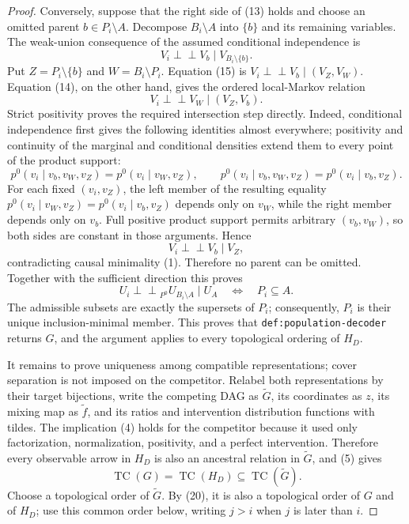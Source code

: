 \documentclass{article}
\begin{document}
\begin{proof}
Conversely, suppose that the right side of (13) holds and choose an omitted parent \(b\in P_i\setminus A\).  Decompose \(B_i\setminus A\) into \(\{b\}\) and its remaining variables.  The weak-union consequence of the assumed conditional independence is
\[
 V_i\mathbin{\perp\!\!\!\perp}V_b
 \mid V_{B_i\setminus\{b\}}.
\tag{15}
\]
Put \(Z=P_i\setminus\{b\}\) and \(W=B_i\setminus P_i\).  Equation (15) is \(V_i\mathbin{\perp\!\!\!\perp}V_b\mid(V_Z,V_W)\).  Equation (14), on the other hand, gives the ordered local-Markov relation
\[
 V_i\mathbin{\perp\!\!\!\perp}V_W\mid(V_Z,V_b).
\tag{16}
\]
Strict positivity proves the required intersection step directly.  Indeed, conditional independence first gives the following identities almost everywhere; positivity and continuity of the marginal and conditional densities extend them to every point of the product support:
\[
 p^0(v_i\mid v_b,v_W,v_Z)=p^0(v_i\mid v_W,v_Z),
 \qquad
 p^0(v_i\mid v_b,v_W,v_Z)=p^0(v_i\mid v_b,v_Z).
\tag{17}
\]
For each fixed \((v_i,v_Z)\), the left member of the resulting equality \(p^0(v_i\mid v_W,v_Z)=p^0(v_i\mid v_b,v_Z)\) depends only on \(v_W\), while the right member depends only on \(v_b\).  Full positive product support permits arbitrary \((v_b,v_W)\), so both sides are constant in those arguments.  Hence
\[
 V_i\mathbin{\perp\!\!\!\perp}V_b\mid V_Z,
\tag{18}
\]
contradicting causal minimality (1).  Therefore no parent can be omitted.  Together with the sufficient direction this proves
\[
 U_i\mathbin{\perp\!\!\!\perp}_{P^0}U_{B_i\setminus A}\mid U_A
 \quad\Longleftrightarrow\quad P_i\subseteq A.
\tag{19}
\]
The admissible subsets are exactly the supersets of \(P_i\); consequently, \(P_i\) is their unique inclusion-minimal member.  This proves that \texttt{def:population-decoder} returns \(G\), and the argument applies to every topological ordering of \(H_D\).

It remains to prove uniqueness among compatible representations; cover separation is not imposed on the competitor.  Relabel both representations by their target bijections, write the competing DAG as \(\widetilde G\), its coordinates as \(z\), its mixing map as \(\widetilde f\), and its ratios and intervention distribution functions with tildes.  The implication (4) holds for the competitor because it used only factorization, normalization, positivity, and a perfect intervention.  Therefore every observable arrow in \(H_D\) is also an ancestral relation in \(\widetilde G\), and (5) gives
\[
 \operatorname{TC}(G)=\operatorname{TC}(H_D)
 \subseteq\operatorname{TC}(\widetilde G).
\tag{20}
\]
Choose a topological order of \(\widetilde G\).  By (20), it is also a topological order of \(G\) and of \(H_D\); use this common order below, writing \(j>i\) when \(j\) is later than \(i\).


\end{proof}
\end{document}
